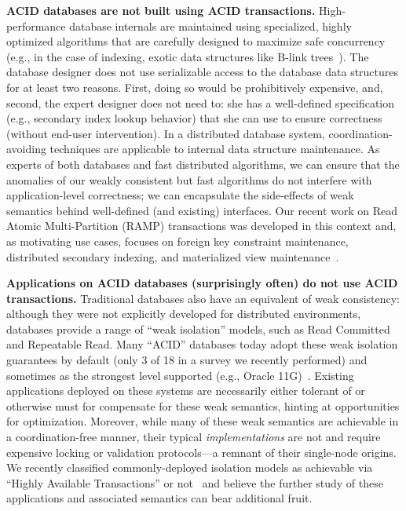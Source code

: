 \documentclass[9pt]{article}
\begin{document}
\begin{myitemize}
\item \textbf{ACID databases are not built using ACID transactions.} High-performance database internals are maintained using specialized, highly optimized algorithms that are carefully designed to maximize safe concurrency~\cite{gray-book} (e.g., in the case of indexing, exotic data structures like B-link trees~\cite{blink-tree}). The database designer does not use serializable access to the database data structures for at least two reasons. First, doing so would be prohibitively expensive, and, second, the expert designer does not need to: she has a well-defined specification (e.g., secondary index lookup behavior) that she can use to ensure correctness (without end-user intervention). In a distributed database system, coordination-avoiding techniques are applicable to internal data structure maintenance. As experts of both databases and fast distributed algorithms, we can ensure that the anomalies of our weakly consistent but fast algorithms do not interfere with application-level correctness; we can encapsulate the side-effects of weak semantics behind well-defined (and existing) interfaces. Our recent work on Read Atomic Multi-Partition (RAMP) transactions was developed in this context and, as motivating use cases, focuses on foreign key constraint maintenance, distributed secondary indexing, and materialized view maintenance~\cite{ramp-txns}.

\item \textbf{Applications on ACID databases (surprisingly often) do not use ACID transactions.} Traditional databases also have an equivalent of weak consistency: although they were not explicitly developed for distributed environments, databases provide a range of ``weak isolation'' models, such as Read Committed and Repeatable Read. Many ``ACID'' databases today adopt these weak isolation guarantees by default (only 3 of 18 in a survey we recently performed) and sometimes as the strongest level supported (e.g., Oracle 11G)~\cite{hat-vldb}. Existing applications deployed on these systems are necessarily either tolerant of or otherwise must for compensate for these weak semantics, hinting at opportunities for optimization. Moreover, while many of these weak semantics are achievable in a coordination-free manner, their typical \textit{implementations} are not and require expensive locking or validation protocols---a remnant of their single-node origins. We recently classified commonly-deployed isolation models as achievable via ``Highly Available Transactions'' or not~\cite{hat-vldb} and believe the further study of these applications and associated semantics can bear additional fruit.


\end{myitemize}
\end{document}
